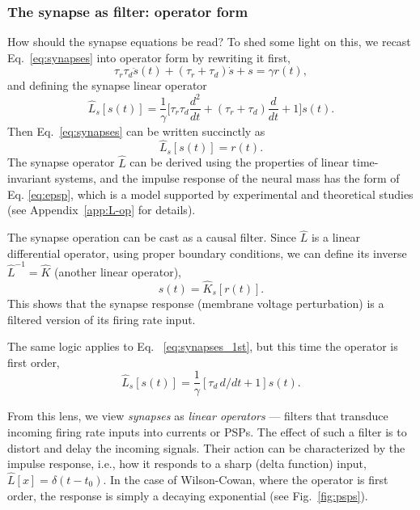 \documentclass[12pt]{article}
\numberwithin{equation}{section}
\begin{document}
 \subsubsection*{The synapse as filter: operator form}
How should the synapse equations be read? To shed some light on this, we recast Eq.~\eqref{eq:synapses} into operator form by rewriting it first,
$$
    \tau_r\tau_d\ddot s(t) + (\tau_r+\tau_d) \dot s +s = \gamma r(t), 
$$
and defining the synapse linear operator
\begin{equation}
\hat L_s [s(t)]= \frac{1}{\gamma} \big[\tau_r\tau_d \frac{d^2}{dt} + (\tau_r+\tau_d) \frac{d}{dt}  +1\big]s(t).
\end{equation}
Then Eq.~\eqref{eq:synapses}  can be written succinctly as 
\begin{equation} \label{eq:L-operator-synapse-equation}
\hat L_s [s(t)] =  r(t) .
\end{equation}
The synapse operator $\hat{L}$ can be derived using the properties of linear time-invariant systems, and the impulse response of the neural mass has the form of Eq. \eqref{eq:epsp}, which is a model supported by experimental and theoretical studies \cite{rallDendriticLocationSynapses1967,burkeCompositeNatureMonosynaptic1967,nelsonAnomalousRectificationCat1967,rallDistinguishingTheoreticalSynaptic1967} (see Appendix~\ref{app:L-op} for details).

The synapse operation can be cast as a causal filter. Since $\hat L$ is a linear differential operator, using proper boundary conditions, we can define its inverse $\hat L ^{-1}= \hat K$ (another linear operator), 
\begin{equation} \label{eq:K-operator-synapse-equation}
s(t) = \hat K_s[ r(t)] .
\end{equation}
This shows that the synapse response (membrane voltage perturbation) is a filtered version of its firing rate input. 

The same logic applies to Eq. ~\ref{eq:synapses_1st}, but this time the operator is first order,
\begin{equation}
\hat L_s [s(t)]= \frac{1}{\gamma}  [\tau_d\, d/dt  +1]s(t).
\end{equation}

From this lens, we view \textit{synapses}   as \textit{linear operators} ---  filters that transduce incoming firing rate inputs into currents or PSPs.
 The effect of such a filter is to distort and delay the incoming signals.
Their action can be characterized by the impulse response, i.e.,   how it responds to a sharp (delta function) input, $\hat L[x] = \delta (t-t_0)$. In the case of Wilson-Cowan, where the operator is first order, the response is simply a decaying exponential (see Fig.~\ref{fig:psps}). 
\end{document}
